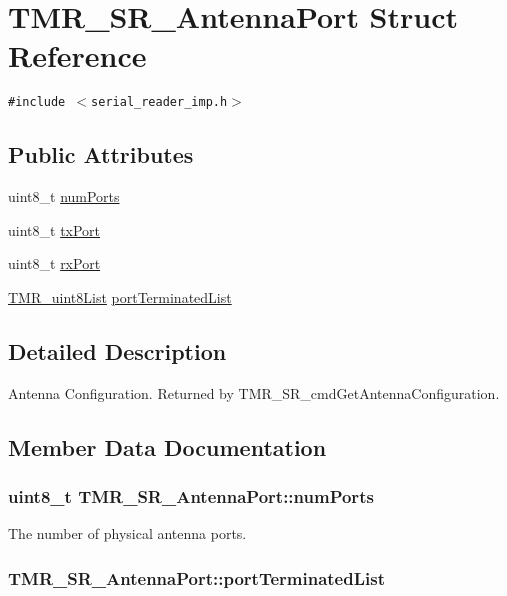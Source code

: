 \hypertarget{struct_t_m_r___s_r___antenna_port}{
\section{TMR\_\-SR\_\-AntennaPort Struct Reference}
\label{struct_t_m_r___s_r___antenna_port}
}
{\tt \#include $<$serial\_\-reader\_\-imp.h$>$}

\subsection*{Public Attributes}
\begin{CompactItemize}
\item 
uint8\_\-t \hyperlink{struct_t_m_r___s_r___antenna_port_b4d7289f1fd8adf6b561bb6a8f1fefde}{numPorts}
\item 
uint8\_\-t \hyperlink{struct_t_m_r___s_r___antenna_port_77de96da6ea523147d339c3df4676d0d}{txPort}
\item 
uint8\_\-t \hyperlink{struct_t_m_r___s_r___antenna_port_06224a474b688f57475d8fe28f087ef3}{rxPort}
\item 
\hyperlink{struct_t_m_r__uint8_list}{TMR\_\-uint8List} \hyperlink{struct_t_m_r___s_r___antenna_port_9e8c15ec0624498d77037e70b7f9016b}{portTerminatedList}
\end{CompactItemize}


\subsection{Detailed Description}
Antenna Configuration. Returned by TMR\_\-SR\_\-cmdGetAntennaConfiguration. 

\subsection{Member Data Documentation}
\hypertarget{struct_t_m_r___s_r___antenna_port_b4d7289f1fd8adf6b561bb6a8f1fefde}{
\subsubsection[{numPorts}]{\setlength{\rightskip}{0pt plus 5cm}uint8\_\-t {\bf TMR\_\-SR\_\-AntennaPort::numPorts}}}
\label{struct_t_m_r___s_r___antenna_port_b4d7289f1fd8adf6b561bb6a8f1fefde}


The number of physical antenna ports. \hypertarget{struct_t_m_r___s_r___antenna_port_9e8c15ec0624498d77037e70b7f9016b}{
\subsubsection[{portTerminatedList}]{ {\bf TMR\_\-SR\_\-AntennaPort::portTerminatedList}}}
\label{struct_t_m_r___s_r___antenna_port_9e8c15ec0624498d77037e70b7f9016b}



